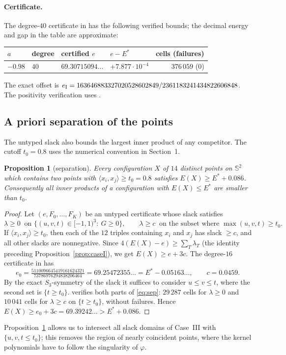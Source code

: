 \documentclass[11pt]{article}
\newtheorem{proposition}[theorem]{Proposition}
\theoremstyle{definition}
\newcommand{\Sph}{\mathbb{S}^2}
\newcommand{\ip}[2]{\langle #1,#2\rangle}
\newcommand{\Es}{E^{\ast}}
\begin{document}
\paragraph{Certificate.} The degree-$40$ certificate in 
has the following verified bounds; the decimal energy and gap in the table are approximate:
\begin{center}
\begin{tabular}{llllr}
\toprule
$a$ & degree & certified $e$ & $e-\Es$ & cells (failures)\\
\midrule
$-0.98$ & $40$ & $69.30715094\ldots$ & $+7.877\cdot10^{-4}$ & $376\,059$ ($0$)\\
\bottomrule
\end{tabular}
\end{center}
The exact offset is $e_{\rm I}=163646883327020528602849/2361183241434822606848$.
The positivity verification uses .

\subsection{A priori separation of the points}\label{sec:sep}
The untyped slack also bounds the largest inner product of any competitor.
The cutoff $t_0=0.8$ uses the numerical convention in Section~1.

\begin{proposition}[separation]\label{prop:sep}
Every configuration $X$ of $14$ distinct points on $\Sph$ which contains two points with $\ip{x_i}{x_j}\ge t_0=0.8$
satisfies $E(X)\ge\Es+0.086$. Consequently all inner products of a configuration with $E(X)\le\Es$ are smaller than $t_0$.
\end{proposition}
\begin{proof}
Let $(e,F_0,\dots,F_K)$ be an untyped certificate whose slack satisfies
\begin{equation}\label{eq:sep}
 \lambda\ge0\ \text{ on }\{(u,v,t)\in[-1,1)^3:\ G\ge0\},\qquad
 \lambda\ge c\ \text{ on the subset where }\max(u,v,t)\ge t_0 .
\end{equation}
If $\ip{x_i}{x_j}\ge t_0$, then each of the $12$ triples containing $x_i$ and $x_j$ has slack $\ge c$, and all other
slacks are nonnegative. Since $4(E(X)-e)\ge\sum_T\lambda_T$ (the identity preceding Proposition~\ref{prop:caseI}), we get
$E(X)\ge e+3c$. The degree-$16$ certificate in
 has
\[
 e_0=\tfrac{5110096645419161624321}{73786976294838206464}=69.25472355\ldots=\Es-0.05163\ldots,\qquad c=0.0459 .
\]
By the exact $S_3$-symmetry of the slack it suffices to consider $u\le v\le t$, where the second set is $\{t\ge t_0\}$.
 verifies both parts of \eqref{eq:sep}: $29\,287$ cells for $\lambda\ge0$ and $10\,041$ cells for
$\lambda\ge c$ on $\{t\ge t_0\}$, without failures. Hence $E(X)\ge e_0+3c=69.39242\ldots>\Es+0.086$.
\end{proof}
Proposition~\ref{prop:sep} allows us to intersect all slack
domains of Case~III with $\{u,v,t\le t_0\}$; this removes the region of nearly coincident points, where the kernel
polynomials have to follow the singularity of $\varphi$.
\end{document}
